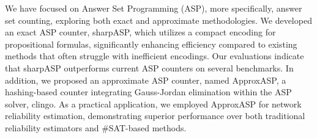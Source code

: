 We have focused on Answer Set Programming (ASP), more specifically, answer set counting, exploring both exact and approximate methodologies. We developed an exact ASP counter, sharpASP, which utilizes a compact encoding for propositional formulas, significantly enhancing efficiency compared to existing methods that often struggle with inefficient encodings. Our evaluations indicate that sharpASP outperforms current ASP counters on several benchmarks. In addition, we proposed an approximate ASP counter, named ApproxASP, a hashing-based counter integrating Gauss-Jordan elimination within the ASP solver, clingo. As a practical application, we employed ApproxASP for network reliability estimation, demonstrating superior performance over both traditional reliability estimators and \#SAT-based methods.